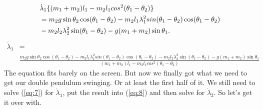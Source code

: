 \documentclass[paper=a4, fontsize=11pt]{scrartcl} %
\numberwithin{equation}{section} %
\numberwithin{figure}{section} %
\numberwithin{table}{section} %
\begin{document}
\begin{align} 
  &\dot{\lambda}_1 \{(m_1 + m_2) l_1 - m_2 l_1 cos^2(\theta_1 - \theta_2)\} \notag \\
  &= m_2 g \sin \theta_2 \cos(\theta_1 - \theta_2) - m_2 l_1 \lambda^2_1 sin(\theta_1 - \theta_2)\cos(\theta_1 - \theta_2) \notag \\
  &- m_2 l_2 \lambda^2_2 \sin(\theta_1 - \theta_2) - g (m_1 + m_2) \sin \theta_1. \label{eq:16}
\end{align}
\begin{align} 
  \dot{\lambda}_1 &= \\ \label{eq:17}
  &\frac{m_2 g \sin \theta_2 \cos(\theta_1 - \theta_2) - m_2 l_1 \lambda^2_1 sin(\theta_1 - \theta_2)\cos(\theta_1 - \theta_2) - m_2 l_2 \lambda^2_2 \sin(\theta_1 - \theta_2) - g (m_1 + m_2) \sin \theta_1}{(m_1 + m_2) l_1 - m_2 l_1 cos^2(\theta_1 - \theta_2)}  
\end{align}
The equation fits barely on the screen. But now we finally got what we need to get our double pendulum swinging. Or at least the first half of it. We still need to 
solve (\ref{eq:7}) for $\dot{\lambda}_1$, put the result into (\ref{eq:8}) and then solve for $\dot{\lambda}_2$. So let's get it over with.
\vspace{\baselineskip}
\end{document}
